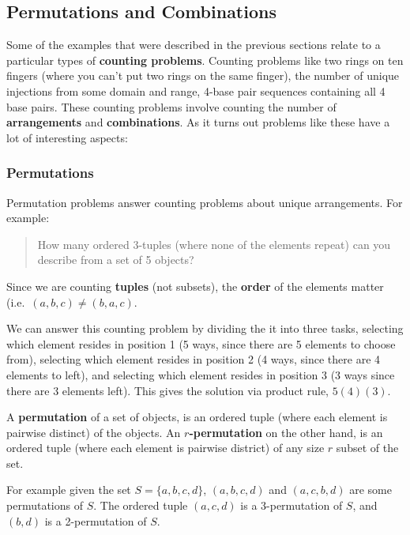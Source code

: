 \hypertarget{permutations-and-combinations}{%
\subsection{Permutations and
Combinations}\label{permutations-and-combinations}}

Some of the examples that were described in the previous sections relate
to a particular types of \textbf{counting problems}. Counting problems
like two rings on ten fingers (where you can't put two rings on the same
finger), the number of unique injections from some domain and range,
4-base pair sequences containing all 4 base pairs. These counting
problems involve counting the number of \textbf{arrangements} and
\textbf{combinations}. As it turns out problems like these have a lot of
interesting aspects:

\hypertarget{permutations}{%
\subsubsection{Permutations}\label{permutations}}

Permutation problems answer counting problems about unique arrangements.
For example:

\begin{quote}
How many ordered 3-tuples (where none of the elements repeat) can you
describe from a set of 5 objects?
\end{quote}

Since we are counting \textbf{tuples} (not subsets), the \textbf{order}
of the elements matter (i.e.~\textbf{\((a,b,c)\neq(b,a,c)\)}.

We can answer this counting problem by dividing the it into three tasks,
selecting which element resides in position 1 (5 ways, since there are 5
elements to choose from), selecting which element resides in position 2
(4 ways, since there are 4 elements to left), and selecting which
element resides in position 3 (3 ways since there are 3 elements left).
This gives the solution via product rule, \textbf{\(5(4)(3)\)}.

A \textbf{permutation} of a set of objects, is an ordered tuple (where
each element is pairwise distinct) of the objects. An
\textbf{\(r\)-permutation} on the other hand, is an ordered tuple (where
each element is pairwise district) of any size \textbf{\(r\)} subset of
the set.

For example given the set \textbf{\(S=\{a,b,c,d\}\)},
\textbf{\((a,b,c,d)\)} and \textbf{\((a,c,b,d)\)} are some permutations
of \textbf{\(S\)}. The ordered tuple \textbf{\((a,c,d)\)} is a
3-permutation of \textbf{\(S\)}, and \textbf{\((b,d)\)} is a
2-permutation of \textbf{\(S\)}.

